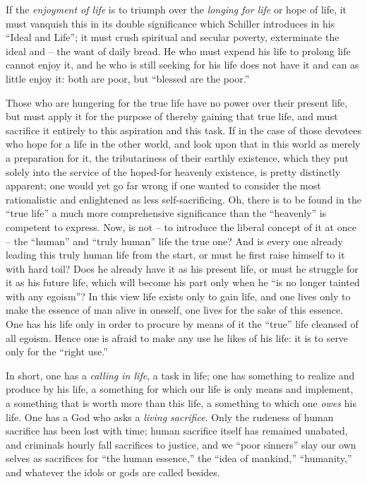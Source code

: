 If the \textit{enjoyment of life} is to triumph over the \textit{longing for 
life} or hope of life, it must vanquish this in its double significance which 
Schiller introduces in his ``Ideal and Life''; it must crush spiritual and 
secular poverty, exterminate the ideal and -- the want of daily bread. He who 
must expend his life to prolong life cannot enjoy it, and he who is still 
seeking for his life does not have it and can as little enjoy it: both are 
poor, but ``blessed are the poor.''

Those who are hungering for the true life have no power over their present 
life, but must apply it for the purpose of thereby gaining that true life, and 
must sacrifice it entirely to this aspiration and this task. If in the case of 
those devotees who hope for a life in the other world, and look upon that in 
this world as merely a preparation for it, the tributariness of their earthly 
existence, which they put solely into the service of the hoped-for heavenly 
existence, is pretty distinctly apparent; one would yet go far wrong if one 
wanted to consider the most rationalistic and enlightened as less 
self-sacrificing. Oh, there is to be found in the ``true life'' a much more 
comprehensive significance than the ``heavenly'' is competent to express. 
Now, is not -- to introduce the liberal concept of it at once -- the 
``human'' and ``truly human'' life the true one? And is every one already 
leading this truly human life from the start, or must he first raise himself 
to it with hard toil? Does he already have it as his present life, or must he 
struggle for it as his future life, which will become his part only when he 
``is no longer tainted with any egoism''? In this view life exists only to 
gain life, and one lives only to make the essence of man alive in oneself, one 
lives for the sake of this essence. One has his life only in order to procure 
by means of it the ``true'' life cleansed of all egoism. Hence one is afraid 
to make any use he likes of his life: it is to serve only for the ``right 
use.''

In short, one has a \textit{calling in life}, a task in life; one has 
something to realize and produce by his life, a something for which our life 
is only means and implement, a something that is worth more than this life, a 
something to which one \textit{owes} his life. One has a God who asks a 
\textit{living sacrifice}. Only the rudeness of human sacrifice has been lost 
with time; human sacrifice itself has remained unabated, and criminals hourly 
fall sacrifices to justice, and we ``poor sinners'' slay our own selves as 
sacrifices for ``the human essence,'' the ``idea of mankind,'' 
``humanity,'' and whatever the idols or gods are called besides.

